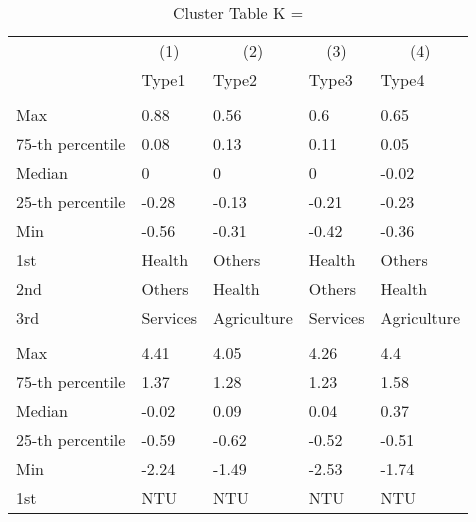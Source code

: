\begin{table}
\centering
\caption{Cluster Table K = }
\centering
\begin{threeparttable}
\begin{tabular}[t]{lllll}
\toprule
\multicolumn{1}{c}{ } & \multicolumn{1}{c}{(1)} & \multicolumn{1}{c}{(2)} & \multicolumn{1}{c}{(3)} & \multicolumn{1}{c}{(4)} \\
\cmidrule(l{3pt}r{3pt}){2-2} \cmidrule(l{3pt}r{3pt}){3-3} \cmidrule(l{3pt}r{3pt}){4-4} \cmidrule(l{3pt}r{3pt}){5-5}
 & Type1 & Type2 & Type3 & Type4\\
\midrule
\addlinespace[0.3em]
\multicolumn{5}{l}{\textit{\textbf{Panel A: }}}\\
\hspace{1em}Max & 0.88 & 0.56 & 0.6 & 0.65\\
\hspace{1em}75-th percentile & 0.08 & 0.13 & 0.11 & 0.05\\
\hspace{1em}Median & 0 & 0 & 0 & -0.02\\
\hspace{1em}25-th percentile & -0.28 & -0.13 & -0.21 & -0.23\\
\hspace{1em}Min & -0.56 & -0.31 & -0.42 & -0.36\\
\hspace{1em}1st & Health & Others & Health & Others\\
\hspace{1em}2nd & Others & Health & Others & Health\\
\hspace{1em}3rd & Services & Agriculture & Services & Agriculture\\
\addlinespace[0.3em]
\multicolumn{5}{l}{\textit{\textbf{Panel B: }}}\\
\hspace{1em}Max & 4.41 & 4.05 & 4.26 & 4.4\\
\hspace{1em}75-th percentile & 1.37 & 1.28 & 1.23 & 1.58\\
\hspace{1em}Median & -0.02 & 0.09 & 0.04 & 0.37\\
\hspace{1em}25-th percentile & -0.59 & -0.62 & -0.52 & -0.51\\
\hspace{1em}Min & -2.24 & -1.49 & -2.53 & -1.74\\
\hspace{1em}1st & NTU & NTU & NTU & NTU\\

\end{tabular}
\end{threeparttable}
\end{table}
